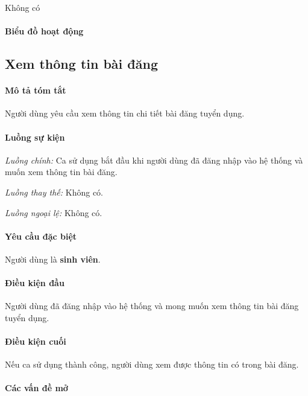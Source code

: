 \documentclass[./../main.tex]{subfiles}
\begin{document}
Không có

\paragraph*{Biểu đồ hoạt động}

\subsection{Xem thông tin bài đăng}

\paragraph*{Mô tả tóm tắt}

Người dùng yêu cầu xem thông tin chi tiết bài đăng tuyển dụng.

\paragraph*{Luồng sự kiện}

\emph{Luồng chính:} Ca sử dụng bắt đầu khi người dùng đã đăng nhập vào
hệ thống và muốn xem thông tin bài đăng.

\emph{Luồng thay thế:} Không có.

\emph{Luồng ngoại lệ:} Không có.

\paragraph*{Yêu cầu đặc biệt}

Người dùng là \textbf{sinh viên}.

\paragraph*{Điều kiện đầu}

Người dùng đã đăng nhập vào hệ thống và mong muốn xem thông tin bài đăng
tuyển dụng.

\paragraph*{Điều kiện cuối}

Nếu ca sử dụng thành công, người dùng xem được thông tin có trong bài
đăng.

\paragraph*{Các vấn đề mở}
\end{document}
